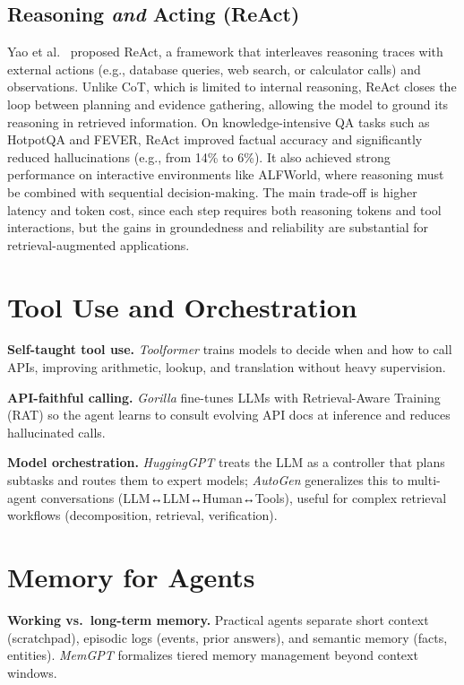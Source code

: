 \subsection{Reasoning \emph{and} Acting (ReAct)}
Yao et al.~\cite{react} proposed ReAct, a framework that interleaves reasoning traces with external actions (e.g., database queries, web search, or calculator calls) and observations. Unlike CoT, which is limited to internal reasoning, ReAct closes the loop between planning and evidence gathering, allowing the model to ground its reasoning in retrieved information. On knowledge-intensive QA tasks such as HotpotQA and FEVER, ReAct improved factual accuracy and significantly reduced hallucinations (e.g., from 14\% to 6\%). It also achieved strong performance on interactive environments like ALFWorld, where reasoning must be combined with sequential decision-making. The main trade-off is higher latency and token cost, since each step requires both reasoning tokens and tool interactions, but the gains in groundedness and reliability are substantial for retrieval-augmented applications.

\section{Tool Use and Orchestration}
\textbf{Self-taught tool use.} \emph{Toolformer} trains models to decide when and how to call APIs, improving arithmetic, lookup, and translation without heavy supervision.

\textbf{API-faithful calling.} \emph{Gorilla} fine-tunes LLMs with Retrieval-Aware Training (RAT) so the agent learns to consult evolving API docs at inference and reduces hallucinated calls.

\textbf{Model orchestration.} \emph{HuggingGPT} treats the LLM as a controller that plans subtasks and routes them to expert models; \emph{AutoGen} generalizes this to multi-agent conversations (LLM↔LLM↔Human↔Tools), useful for complex retrieval workflows (decomposition, retrieval, verification).

\section{Memory for Agents}
\textbf{Working vs.\ long-term memory.} Practical agents separate short context (scratchpad), episodic logs (events, prior answers), and semantic memory (facts, entities). \emph{MemGPT} formalizes tiered memory management beyond context windows.

